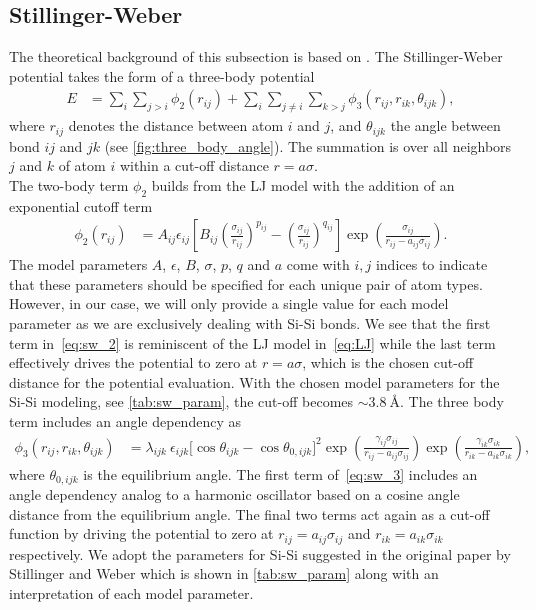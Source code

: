 \subsection{Stillinger-Weber}\label{sec:wb}
The theoretical background of this subsection is based on \cite{docs_lammps_sw, PhysRevB.31.5262}. The Stillinger-Weber potential takes the form of a three-body potential
\begin{align*}
  E &=\sum_i \sum_{j>i} \phi_2(r_{i j})+\sum_i \sum_{j \neq i} \sum_{k>j} \phi_3(r_{ij}, r_{ik}, \theta_{ijk}),
\end{align*}
where $r_{ij}$ denotes the distance between atom $i$ and $j$, and $\theta_{ijk}$
the angle between bond $ij$ and $jk$ (see \cref{fig:three_body_angle}). The summation is over all neighbors $j$
and $k$ of atom $i$ within a cut-off distance $r = a\sigma$. \\
The two-body term $\phi_2$ builds from the \acrshort{LJ} model with the addition of an exponential cutoff term
\begin{align}
  \phi_2(r_{i j}) & =A_{ij} \epsilon_{ij}\left[B_{ij}\left(\frac{\sigma_{ij}}{r_{ij}}\right)^{p_{ij}} - \left(\frac{\sigma_{ij}}{r_{ij}}\right)^{q_{ij}}\right] \exp (\frac{\sigma_{ij}}{r_{ij}-a_{ij} \sigma_{ij}}).
  \label{eq:sw_2}
\end{align}
The model parameters $A$, $\epsilon$, $B$, $\sigma$, $p$, $q$ and $a$ come with
$i,j$ indices to indicate that these parameters should be specified for each
unique pair of atom types. However, in our case, we will only provide a single
value for each model parameter as we are exclusively dealing with Si-Si bonds.
We see that the first term in~\cref{eq:sw_2} is reminiscent of the \acrshort{LJ} model in~\cref{eq:LJ} while the last term effectively drives the potential to zero at $r=a\sigma$, which is the chosen cut-off distance for the potential
evaluation. With the chosen model parameters for the Si-Si modeling, see
\cref{tab:sw_param}, the cut-off becomes $\sim \SI{3.8}{\text{Å}}$. The three body term includes an angle dependency as
\begin{align}
  \phi_3(r_{ij}, r_{ik}, \theta_{ijk}) &= \lambda_{ijk} \ \epsilon_{ijk} \Big[\cos \theta_{ijk}-\cos \theta_{0,ijk}\Big]^2 \exp (\frac{\gamma_{ij} \sigma_{ij}}{r_{ij} - a_{ij} \sigma_{ij}}) \exp (\frac{\gamma_{ik} \sigma_{ik}}{r_{ik} - a_{ik} \sigma_{ik}}),
  \label{eq:sw_3}
\end{align}
where $\theta_{0,ijk}$ is the equilibrium angle. The first term of~\cref{eq:sw_3} includes an angle dependency analog to a harmonic oscillator
based on a cosine angle distance from the equilibrium angle. The final two terms
act again as a cut-off function by driving the potential to zero at $r_{ij} =
a_{ij}\sigma_{ij}$ and $r_{ik} = a_{ik}\sigma_{ik}$ respectively. We adopt the parameters for Si-Si suggested in the original paper by Stillinger and Weber \cite{PhysRevB.31.5262} which is shown in \cref{tab:sw_param} along with an interpretation of each model parameter.


